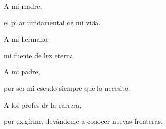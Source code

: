 \begin{dedication}
    A mi madre, 

    el pilar fundamental de mi vida.

    A mi hermano,

    mi fuente de luz eterna.

    A mi padre, 

    por ser mi escudo siempre que lo necesito.

    A los profes de la carrera,

    por exigirme, llev\'andome a conocer nuevas fronteras.

\end{dedication}
